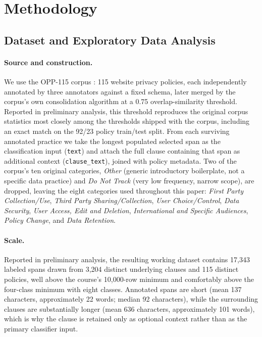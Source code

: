 \documentclass[11pt]{acl}
\begin{document}
\section{Methodology}
\label{sec:methodology}

\subsection{Dataset and Exploratory Data Analysis}
\label{sec:dataset}

\paragraph{Source and construction.} We use the OPP-115 corpus
\cite{wilson-etal-2016-creation}: 115 website privacy policies, each independently
annotated by three annotators against a fixed schema, later merged by the corpus's own
consolidation algorithm at a 0.75 overlap-similarity threshold. Reported in preliminary
analysis, this threshold reproduces the original corpus statistics most closely among
the thresholds shipped with the corpus, including an exact match on the 92/23 policy
train/test split. From each surviving annotated practice we take the longest populated
selected span as the classification input (\texttt{text}) and attach the full clause
containing that span as additional context (\texttt{clause\_text}), joined with policy
metadata. Two of the corpus's ten original categories, \emph{Other} (generic
introductory boilerplate, not a specific data practice) and \emph{Do Not Track} (very
low frequency, narrow scope), are dropped, leaving the eight categories used throughout
this paper: \emph{First Party Collection/Use}, \emph{Third Party Sharing/Collection},
\emph{User Choice/Control}, \emph{Data Security}, \emph{User Access, Edit and Deletion},
\emph{International and Specific Audiences}, \emph{Policy Change}, and \emph{Data
Retention}.

\paragraph{Scale.} Reported in preliminary analysis, the resulting working dataset
contains 17{,}343 labeled spans drawn from 3{,}204 distinct underlying clauses and 115
distinct policies, well above the course's 10{,}000-row minimum and comfortably above
the four-class minimum with eight classes. Annotated spans are short (mean 137
characters, approximately 22 words; median 92 characters), while the surrounding clauses
are substantially longer (mean 636 characters, approximately 101 words), which is why
the clause is retained only as optional context rather than as the primary classifier
input.
\end{document}
